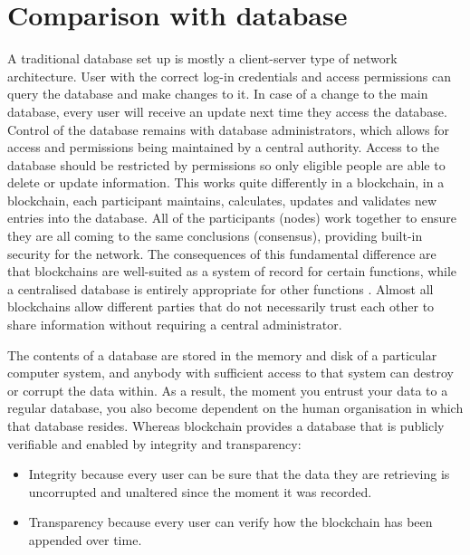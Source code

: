 \section{Comparison with database}

A traditional database set up is mostly a client-server type of network architecture. User with the correct log-in credentials and access permissions can query the database and make changes to it. In case of a change to the main database, every user will receive an update next time they access the database. Control of the database remains with database administrators, which allows for access and permissions being maintained by a central authority. Access to the database should be restricted by permissions so only eligible people are able to delete or update information. This works quite differently in a blockchain, in a blockchain, each participant maintains, calculates, updates and validates new entries into the database. All of the participants (nodes) work together to ensure they are all coming to the same conclusions (consensus), providing built-in security for the network. The consequences of this fundamental difference are that blockchains are well-suited as a system of record for certain functions, while a centralised database is entirely appropriate for other functions \cite{steemit}. Almost all blockchains allow different parties that do not necessarily trust each other to share information without requiring a central administrator. 

The contents of a database are stored in the memory and disk of a particular computer system, and anybody with sufficient access to that system can destroy or corrupt the data within. As a result, the moment you entrust your data to a regular database, you also become dependent on the human organisation in which that database resides. Whereas blockchain provides a database that is publicly verifiable and enabled by integrity and transparency: \cite{steemit}
\begin{itemize}
    \item Integrity because every user can be sure that the data they are retrieving is uncorrupted and unaltered since the moment it was recorded.
    \item Transparency because every user can verify how the blockchain has been appended over time.
\end{itemize}


